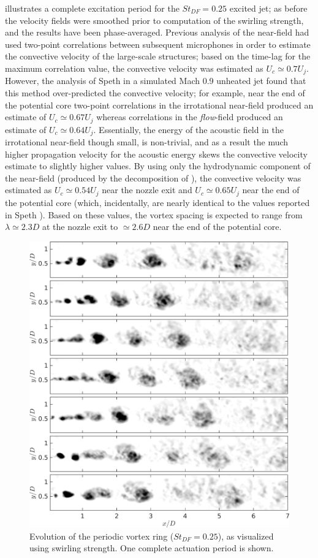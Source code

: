  illustrates a complete excitation period for the $St_{DF} = 0.25$ excited jet; as before the velocity fields were smoothed prior to computation of the swirling strength, and the results have been phase-averaged.
Previous analysis of the near-field had used two-point correlations between subsequent microphones in order to estimate the convective velocity of the large-scale structures; based on the time-lag for the maximum correlation value, the convective velocity was estimated as $U_c \simeq 0.7 U_j$.
However, the analysis of Speth \citep{Speth2015} in a simulated Mach 0.9 unheated jet found that this method over-predicted the convective velocity; for example, near the end of the potential core two-point correlations in the irrotational near-field produced an estimate of $U_c \simeq 0.67 U_j$ whereas correlations in the \textit{flow}-field produced an estimate of $U_c \simeq 0.64 U_j$.
Essentially, the energy of the acoustic field in the irrotational near-field though small, is non-trivial, and as a result the much higher propagation velocity for the acoustic energy skews the convective velocity estimate to slightly higher values.
By using only the hydrodynamic component of the near-field (produced by the decomposition of ), the convective velocity was estimated as $U_c \simeq 0.54 U_j$ near the nozzle exit and $U_c \simeq 0.65 U_j$ near the end of the potential core (which, incidentally, are nearly identical to the values reported in Speth \citep{Speth2015}).
Based on these values, the vortex spacing is expected to range from $\lambda \simeq 2.3D$ at the nozzle exit to $\simeq 2.6D$ near the end of the potential core.
\begin{figure}
	\centering
	\includegraphics[width=5in]{Figures/ch4_St025_lambda.png}
	\caption{Evolution of the periodic vortex ring ($St_{DF}=0.25$), as visualized using swirling strength. One complete actuation period is shown.}
	\label{fig:ch4_period_structure_disintegration}
\end{figure}

